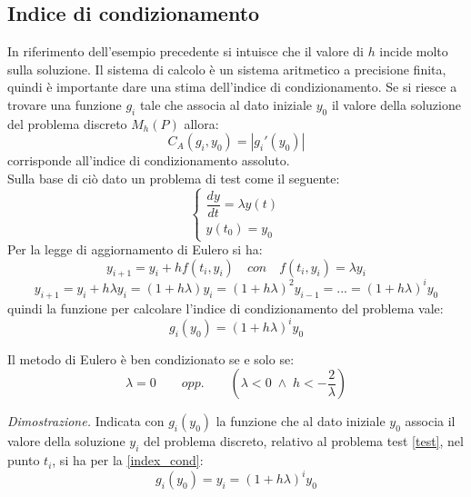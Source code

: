 \subsection{Indice di condizionamento}
In riferimento dell'esempio precedente si intuisce che il valore di $h$ incide molto sulla soluzione. 
Il sistema di calcolo è un sistema aritmetico a precisione finita, quindi è importante dare una stima dell'indice di condizionamento. Se si riesce a trovare una funzione $g_i$ tale che associa al dato iniziale $y_0$ il valore della soluzione del problema discreto $M_h(P)$ allora:
\begin{equation*}
	C_A(g_i,y_0) = |g_i'(y_0)|
\end{equation*}
corrisponde all'indice di condizionamento assoluto.
\\Sulla base di ciò dato un problema di test come il seguente:
\begin{equation}
	\label{test}
	\begin{cases}
		\dfrac{dy}{dt} = \lambda y(t) \\[0.2cm]
		y(t_{0}) = y_0
	\end{cases}
\end{equation}
Per la legge di aggiornamento di Eulero si ha:
\begin{equation*}
	y_{i+1} = y_i + hf(t_i,y_i) \quad con \quad f(t_i,y_i) = \lambda y_i 
\end{equation*}
\begin{equation*}
	y_{i+1} = y_i + h\lambda y_i = (1+h\lambda)y_i = (1+h\lambda)^2y_{i-1} = ... = (1+h\lambda)^iy_0
\end{equation*}
quindi la funzione per calcolare l'indice di condizionamento del problema vale:
\begin{equation}
	\label{index_cond}
	g_i(y_0) = (1+h\lambda)^iy_0
\end{equation}
\begin{prop}[Condizionamento]
	Il metodo di Eulero è ben condizionato se e solo se:
	\begin{equation}
		\label{indice}
		\lambda = 0 \qquad opp. \qquad \left( \lambda<0 \; \wedge \; h < -\dfrac{2}{\lambda}\right)
	\end{equation}
\end{prop}
\textit{Dimostrazione.} Indicata con $g_i(y_0)$ la funzione che al dato iniziale $y_0$ associa il valore della soluzione $y_i$ del problema discreto, relativo al problema test \ref{test}, nel punto $t_i$, si ha per la \ref{index_cond}:
\begin{equation*}
	g_i(y_0) = y_i = (1+h\lambda)^i y_0
\end{equation*}
